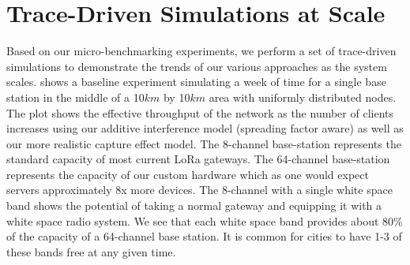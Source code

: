 \section{Trace-Driven Simulations at Scale}
\label{sec:simulations}

Based on our micro-benchmarking experiments, we perform a set of trace-driven simulations to demonstrate the trends of our various approaches as the system scales.   shows a baseline experiment simulating a week of time for a single base station in the middle of a 10$km$ by 10$km$ area with uniformly distributed nodes. The plot shows the effective throughput of the network as the number of clients increases using our additive interference model (spreading factor aware) as well as our more realistic capture effect model.  The 8-channel base-station represents the standard capacity of most current LoRa gateways.  The 64-channel base-station represents the capacity of our custom hardware which as one would expect servers approximately 8x more devices.  The 8-channel with a single white space band shows the potential of taking a normal gateway and equipping it with a white space radio system.  We see that each white space band provides about 80\% of the capacity of a 64-channel base station.  It is common for cities to have 1-3 of these bands free at any given time. 
 



